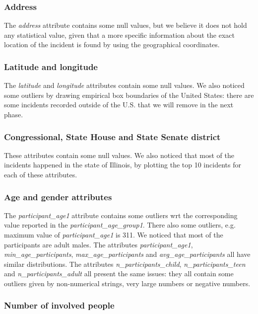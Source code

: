 \documentclass[10pt,a4paper]{report}
\begin{document}
\subsubsection{Address}

The \textit{address} attribute contains some null values, but we believe it does not hold any statistical value, given that a more specific information about the exact location of the incident is found by using the geographical coordinates.

\subsubsection{Latitude and longitude}

The \textit{latitude} and \textit{longitude} attributes contain some null values.
We also noticed some outliers by drawing empirical box boundaries of the United States: there are some incidents recorded outside of the U.S. that we will remove in the next phase.

\subsubsection{Congressional, State House and State Senate district}

These attributes contain some null values.
We also noticed that most of the incidents happened in the state of Illinois, by plotting the top 10 incidents for each of these attributes.

\subsubsection{Age and gender attributes}

The \textit{participant\_age1} attribute contains some outliers wrt the corresponding value reported in the \textit{participant\_age\_group1}.
There also some outliers, e.g. maximum value of \textit{participant\_age1} is 311.
We noticed that most of the participants are adult males.
The attributes \textit{participant\_age1}, \textit{min\_age\_participants}, \textit{max\_age\_participants} and \textit{avg\_age\_participants} all have similar distributions.
The attributes \textit{n\_participants\_child}, \textit{n\_participants\_teen} and \textit{n\_participants\_adult} all present the same issues: they all contain some outliers given by non-numerical strings, very large numbers or negative numbers.

\subsubsection{Number of involved people}
\end{document}
